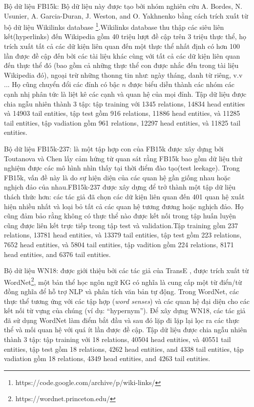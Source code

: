 Bộ dữ liệu FB15k: Bộ dữ liệu này được tạo bởi nhóm nghiên cứu A. Bordes, N. Usunier, A. Garcia-Duran, J. Weston, and O. Yakhnenko \cite{bordes2013translating} bằng cách trích xuất từ bộ dữ liệu Wikilinks database \footnote{https://code.google.com/archive/p/wiki-links/}.Wikilinks database thu thập các siêu liên kết(hyperlinks) đến Wikipedia gồm 40 triệu lượt đề cập trên 3 triệu thực thể, họ trích xuất tất cả các dữ kiện liên quan đến một thực thể nhất định có hơn 100 lần được đề cập đến bởi các tài liệu khác cùng với tất cả các dữ kiện liên quan đến thực thể đó (bao gồm cả những thực thể con được nhắc đến trong tài liệu Wikipedia đó), ngoại trừ những thonng tin như: ngày tháng, danh từ riêng, v.v ... Họ cũng chuyển đổi các đỉnh có bậc \(n\) được biểu diễn thành các nhóm các cạnh nhị phân tức là liệt kê các cạnh và quan hệ của mọi đỉnh. Tập dữ liệu được chia ngẫu nhiên thành 3 tập: tập training với 1345 relations, 14834 head entities và 14903 tail entities, tập test gồm 916 relations, 11886 head entities, và 11285 tail entities, tập vadiation gồm 961 relations, 12297 head entities, và 11825 tail entities.

Bộ dữ liệu FB15k-237: là một tập hợp con của FB15k được xây dựng bởi Toutanova và Chen \cite{toutanova2015observed} lấy cảm hứng từ quan sát rằng FB15k bao gồm dữ liệu thử nghiệm được các mô hình nhìn thấy tại thời điểm đào tạo(test leekage). Trong FB15k, vấn đề này là do sự hiện diện của các quan hệ gần giống nhau hoặc nghịch đảo của nhau.FB15k-237 được xây dựng để trở thành một tập dữ liệu thách thức hơn: các tác giả đã chọn các dữ kiện liên quan đến 401 quan hệ xuất hiện nhiều nhất và loại bỏ tất cả các quan hệ tương đương hoặc nghịch đảo. Họ cũng đảm bảo rằng không có thực thể nào được kết nối trong tập huấn luyện cũng được liên kết trực tiếp trong tập test và validation.Tập training gồm 237 relations, 13781 head entities, và 13379 tail entities, tập test gồm 223 relations, 7652 head entities, và 5804 tail entities, tập vadition gồm 224 relations, 8171 head entities, and 6376 tail entities.

Bộ dữ liệu WN18: được giới thiệu bởi các tác giả của TransE \cite{bordes2013translating}, được trích xuất từ WordNet\footnote{https://wordnet.princeton.edu/}, một bản thể học ngôn ngữ KG có nghĩa là cung cấp một từ điển/từ đồng nghĩa để hỗ trợ NLP và phân tích văn bản tự động. Trong WordNet, các thực thể tương ứng với các tập hợp (\textit{word senses}) và các quan hệ đại diện cho các kết nối từ vựng của chúng (ví dụ: “hypernym”). Để xây dựng WN18, các tác giả đã sử dụng WordNet làm điểm bắt đầu và sau đó lặp đi lặp lại lọc ra các thực thể và mối quan hệ với quá ít lần được đề cập. Tập dữ liệu được chia ngẫu nhiên thành 3 tập: tập training với 18 relations, 40504 head entities, và 40551 tail entities, tập test gồm 18 relations, 4262 head entities, and 4338 tail entities, tập vadiation gồm 18 relations, 4349 head entities, and 4263 tail entities.

